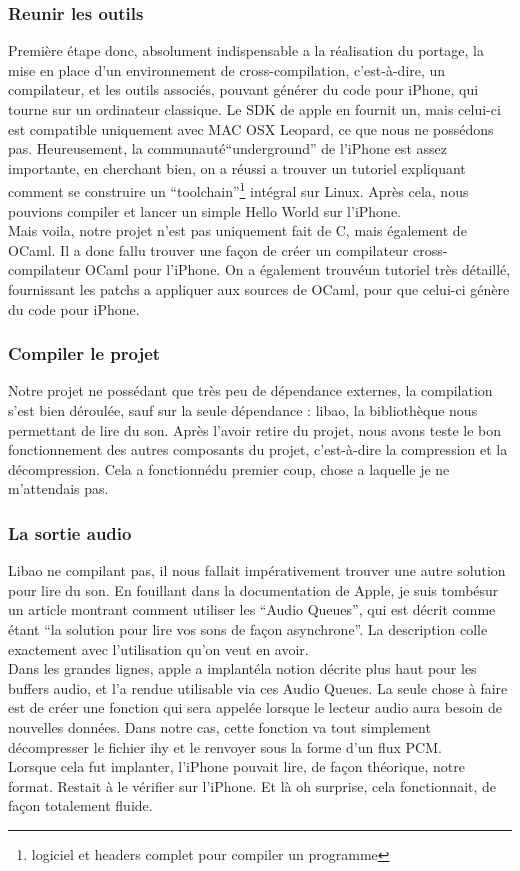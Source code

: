 \documentclass[a4paper,12pt]{article}
\begin{document}
		\subsubsection{Reunir les outils}
Premi\`ere \'etape donc, absolument indispensable a la r\'ealisation du
portage, la mise en place d'un environnement de cross-compilation,
c'est-à-dire, un compilateur, et les outils associ\'es,  pouvant g\'en\'erer du code
pour iPhone, qui
tourne sur un ordinateur classique. Le SDK de apple en fournit un, mais
celui-ci est compatible uniquement avec MAC OSX Leopard, ce que nous ne
poss\'edons pas. Heureusement, la communaut\'e``underground'' de l'iPhone
est assez importante, en cherchant bien, on a r\'eussi a trouver un
tutoriel expliquant comment se construire un
``toolchain''\footnote{logiciel et headers complet pour compiler un
programme} int\'egral sur Linux. Apr\`es cela, nous pouvions compiler et lancer un
simple Hello World sur l'iPhone.\\
Mais voila, notre projet n'est pas uniquement fait de C, mais \'egalement
de OCaml. Il a donc fallu trouver une façon de cr\'eer un compilateur
cross-compilateur OCaml
pour l'iPhone. On a \'egalement trouv\'eun tutoriel tr\`es d\'etaill\'e, fournissant les
patchs a appliquer aux sources de OCaml, pour que celui-ci g\'en\`ere du code pour
iPhone.
		\subsubsection{Compiler le projet}
Notre projet ne poss\'edant que tr\`es peu de d\'ependance externes, la
compilation s'est bien d\'eroul\'ee, sauf sur la seule d\'ependance : libao, la
biblioth\`eque nous permettant de lire du son. Apr\`es l'avoir retire du
projet, nous avons teste le bon fonctionnement des autres composants du
projet, c'est-à-dire la compression et la d\'ecompression. Cela a
fonctionn\'edu premier coup, chose a laquelle je ne m'attendais pas.\\
		\subsubsection{La sortie audio}
Libao ne compilant pas, il nous fallait imp\'erativement trouver une autre
solution pour lire du son. En fouillant dans la documentation de Apple, je suis
tomb\'esur un article montrant comment utiliser les ``Audio Queues'', qui est
d\'ecrit comme \'etant ``la solution pour lire vos sons de façon asynchrone''. La
description colle exactement avec l'utilisation qu'on veut en avoir.\\
Dans les grandes lignes, apple a implant\'ela notion d\'ecrite plus haut pour
les buffers audio, et l'a rendue utilisable via ces Audio Queues. La seule chose
à faire est de cr\'eer une fonction qui sera appel\'ee lorsque le lecteur audio aura
besoin de nouvelles donn\'ees. Dans notre cas, cette fonction va tout simplement
d\'ecompresser le fichier ihy et le renvoyer sous la forme d'un flux PCM.\\
Lorsque cela fut implanter, l'iPhone pouvait lire, de façon th\'eorique, notre
format. Restait à le v\'erifier sur l'iPhone. Et là oh surprise, cela
fonctionnait, de façon totalement fluide. 
\end{document}
